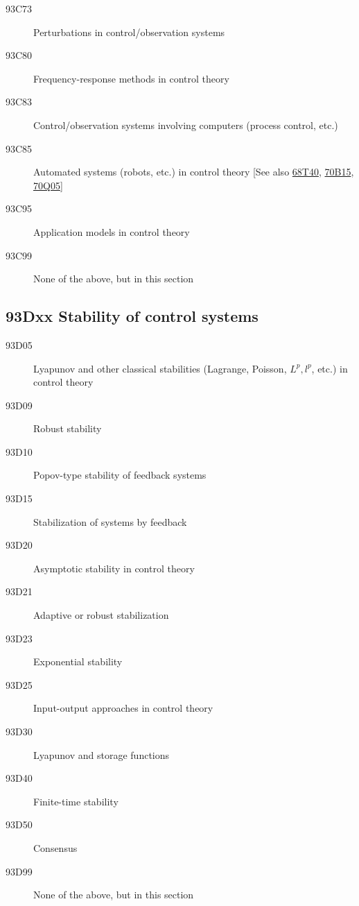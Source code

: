 \documentclass[letterpaper]{article}
\begin{document}
\begin{description}
\item [93C73]\label{93C73} Perturbations in control/observation systems
\item [93C80]\label{93C80} Frequency-response methods in control theory
\item [93C83]\label{93C83} Control/observation systems involving computers (process control, etc.)
\item [93C85]\label{93C85} Automated systems (robots, etc.) in control theory [See also \hyperref[68T40]{68T40}, \hyperref[70B15]{70B15}, \hyperref[70Q05]{70Q05}]
\item [93C95]\label{93C95} Application models in control theory
\item [93C99]\label{93C99} None of the above, but in this section
\end{description}
\subsection*{93Dxx  Stability of control systems}\label{93Dxx}
\begin{description}  
\item [93D05]\label{93D05} Lyapunov and other classical stabilities (Lagrange, Poisson, $L^p, l^p$, etc.) in control theory 
\item [93D09]\label{93D09} Robust stability  
\item [93D10]\label{93D10} Popov-type stability of feedback systems
\item [93D15]\label{93D15} Stabilization of systems by feedback
\item [93D20]\label{93D20} Asymptotic stability in control theory  
\item [93D21]\label{93D21} Adaptive or robust stabilization 
\item [93D23]\label{93D23} Exponential stability
\item [93D25]\label{93D25} Input-output approaches in control theory  
\item [93D30]\label{93D30} Lyapunov and storage functions  
\item [93D40]\label{93D40} Finite-time stability 
\item [93D50]\label{93D50} Consensus
\item [93D99]\label{93D99} None of the above, but in this section
\end{description}
\end{document}
